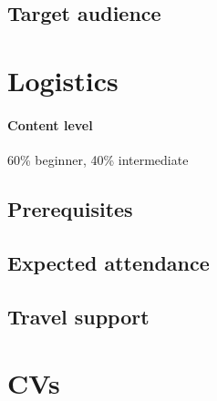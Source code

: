 \documentclass[a4paper,11pt]{article}
\begin{document}
\subsection*{Target audience}






%

\section{Logistics}

\paragraph*{Content level} 60\% beginner, 40\% intermediate

\subsection*{Prerequisites}


\subsection*{Expected attendance}


\subsection*{Travel support}

\newpage

\section{CVs}


%
\end{document}
